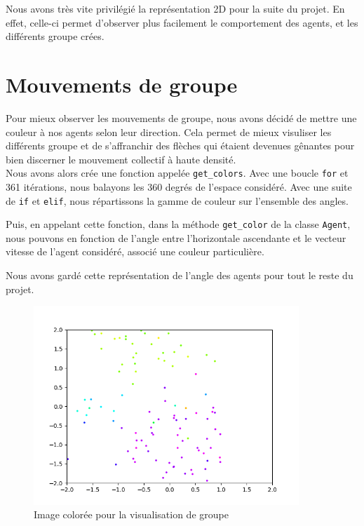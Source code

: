 \documentclass[french, a4paper, 12pt, openany]{report}
\begin{document}
   Nous avons très vite privilégié la représentation 2D pour la suite du projet. En effet, celle-ci permet d'observer plus facilement le comportement des agents, et les différents groupe crées. 
   
   
\section{Mouvements de groupe}

   Pour mieux observer les mouvements de groupe, nous avons décidé de mettre une couleur à nos agents selon leur direction. Cela permet de mieux visuliser les différents groupe et de s'affranchir des flèches qui étaient devenues gênantes pour bien discerner le mouvement collectif à haute densité.\\
   
   Nous avons alors crée une fonction appelée \verb|get_colors|. Avec une boucle \verb|for| et 361 itérations, nous balayons les 360 degrés de l'espace considéré. Avec une suite de \verb|if| et \verb|elif|, nous répartissons la gamme de couleur sur l'ensemble des angles.
   
   Puis, en appelant cette fonction, dans la méthode \verb|get_color| de la classe \verb|Agent|, nous pouvons en fonction de l'angle entre l'horizontale ascendante et le vecteur vitesse de l'agent considéré, associé une couleur particulière.
   
   
   
   Nous avons gardé cette représentation de l'angle des agents pour tout le reste du projet.
   \begin{figure}[!h]
		\centering
		\includegraphics[width=10cm]{images/image_6.png}
		\caption{Image colorée pour la visualisation de groupe}
		\label{couleurs_image}
	\end{figure}  
   
\end{document}
